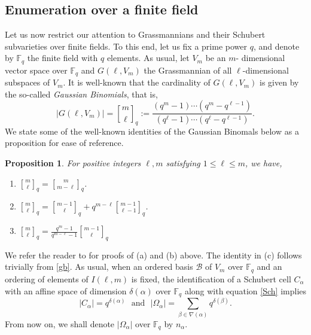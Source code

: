 \documentclass[10pt,a4paper,oneside]{amsproc}
\newtheorem{proposition}[theorem]{Proposition}
\newcommand{\B}{\mathcal{B}}
\newcommand{\Fq}{\mathbb{F}_q}
\def\a{{\alpha}}
\def\Fq{{\mathbb F}_q}
\begin{document}
\subsection{Enumeration over a finite field}\label{sec:en} Let us now restrict our attention to Grassmannians and their Schubert subvarieties over finite fields. To this end, let us fix a prime power $q$, and denote by $\Fq$ the finite field with $q$ elements. As usual, let $V_m$ be an $m$- dimensional vector space over $\Fq$ and $G(\ell, V_m)$ the Grassmannian of all $\ell$-dimensional subspaces of $V_m$. It is well-known  that the cardinality of $G(\ell, V_m)$ is given by the so-called \emph{Gaussian Binomials}, that is, 
\begin{equation}\label{gb}
   |G(\ell, V_m)| = {m \brack \ell}_q := \frac{(q^m - 1)\cdots (q^m - q^{\ell - 1})}{(q^\ell - 1)\cdots (q^\ell - q^{\ell - 1})}. 
\end{equation}
We state some of the well-known identities of the Gaussian Binomals below as a proposition for ease of reference. 

\begin{proposition}\label{identities}
    For positive integers $\ell, m$ satisfying $1 \le \ell \le m$, we have,
    \begin{enumerate}
        \item[(a)] ${m \brack \ell}_q = {m \brack m - \ell}_q$. 
        \item[(b)] ${m \brack \ell}_q = {m - 1 \brack \ell}_q + q^{m- \ell}{m - 1 \brack \ell - 1}_q$.
        \item[(c)] ${m \brack \ell}_q = \frac{q^m - 1}{q^{m - \ell} - 1} {m - 1 \brack \ell}_q$
    \end{enumerate}
\end{proposition}
We refer the reader to \cite[Section 3.2]{A} for proofs of (a) and (b) above. 
The identity in (c) follows trivially from  \eqref{gb}. As usual, when an ordered basis $\B$ of $V_m$ over $\Fq$ and an ordering of elements of $I(\ell, m)$ is fixed,  the identification of a Schubert cell $C_\a$ with an affine space of dimension $\delta (\a)$ over $\Fq$ along with equation \eqref{Sch} implies
\begin{equation}\label{schcard}
|C_\a| = q^{\delta (\a)} \ \ \ \text{and} \ \ \  |\Omega_\a| = \sum_{\beta \in \nabla (\a)} q^{\delta (\beta)}.
\end{equation}
From now on, we shall denote $|\Omega_\a|$ over $\Fq$ by $n_\a$.%
\end{document}
